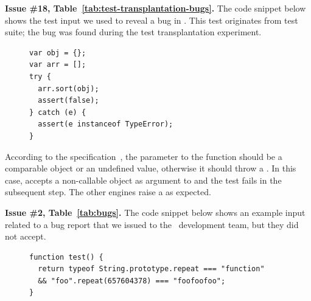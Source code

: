 \documentclass[10pt,conference,anonymous]{IEEEtran}
\begin{document}
\vspace{1ex}\noindent\textbf{Issue \#18,
  Table~\ref{tab:test-transplantation-bugs}.}  The code snippet below
shows the test input we used to reveal a bug in \jsc{}. This test
originates from \jerry{} test suite; the bug was found during the test
transplantation experiment.

\begin{figure}[h!]
  \centering
  \scriptsize
  \begin{lstlisting}
var obj = {};
var arr = [];
try {
  arr.sort(obj);
  assert(false);
} catch (e) {
  assert(e instanceof TypeError);
}
  \end{lstlisting}
  \normalsize
\end{figure}

According to the specification~\cite{ecmas262-array-sort}, the
parameter to the  function should be a comparable
object or an undefined value, otherwise it should throw a
. In this case, \jsc{} accepts a non-callable object
as argument to  and the test fails in the subsequent
step. The other engines raise a  as expected.

\vspace{1ex}\noindent\textbf{Issue \#2, Table~\ref{tab:bugs}.}  The
code snippet below shows an example input related to a bug report that
we issued to the \chakra\ development team, but they did not accept.

\begin{figure}[h!]
  \centering
  \scriptsize
  \begin{lstlisting}
function test() {
  return typeof String.prototype.repeat === "function"
  && "foo".repeat(657604378) === "foofoofoo";
}
  \end{lstlisting}
  \normalsize
\end{figure}
\end{document}

